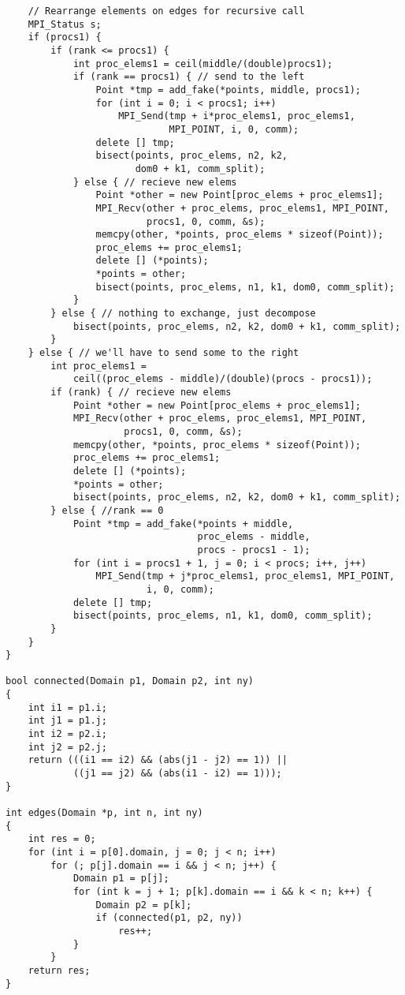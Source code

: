 \documentclass[oneside,final,14pt]{extreport}
\begin{document}
\begin{verbatim}
    // Rearrange elements on edges for recursive call
    MPI_Status s;
    if (procs1) {
        if (rank <= procs1) {
            int proc_elems1 = ceil(middle/(double)procs1);
            if (rank == procs1) { // send to the left
                Point *tmp = add_fake(*points, middle, procs1);
                for (int i = 0; i < procs1; i++)
                    MPI_Send(tmp + i*proc_elems1, proc_elems1,
                             MPI_POINT, i, 0, comm);
                delete [] tmp;
                bisect(points, proc_elems, n2, k2,
                       dom0 + k1, comm_split);
            } else { // recieve new elems
                Point *other = new Point[proc_elems + proc_elems1];
                MPI_Recv(other + proc_elems, proc_elems1, MPI_POINT,
                         procs1, 0, comm, &s);
                memcpy(other, *points, proc_elems * sizeof(Point));
                proc_elems += proc_elems1;
                delete [] (*points);
                *points = other;
                bisect(points, proc_elems, n1, k1, dom0, comm_split);
            }
        } else { // nothing to exchange, just decompose
            bisect(points, proc_elems, n2, k2, dom0 + k1, comm_split);
        }
    } else { // we'll have to send some to the right
        int proc_elems1 =
            ceil((proc_elems - middle)/(double)(procs - procs1));
        if (rank) { // recieve new elems
            Point *other = new Point[proc_elems + proc_elems1];
            MPI_Recv(other + proc_elems, proc_elems1, MPI_POINT,
                     procs1, 0, comm, &s);
            memcpy(other, *points, proc_elems * sizeof(Point));
            proc_elems += proc_elems1;
            delete [] (*points);
            *points = other;
            bisect(points, proc_elems, n2, k2, dom0 + k1, comm_split);
        } else { //rank == 0
            Point *tmp = add_fake(*points + middle,
                                  proc_elems - middle,
                                  procs - procs1 - 1);
            for (int i = procs1 + 1, j = 0; i < procs; i++, j++)
                MPI_Send(tmp + j*proc_elems1, proc_elems1, MPI_POINT,
                         i, 0, comm);
            delete [] tmp;
            bisect(points, proc_elems, n1, k1, dom0, comm_split);
        }
    }
}

bool connected(Domain p1, Domain p2, int ny)
{
    int i1 = p1.i;
    int j1 = p1.j;
    int i2 = p2.i;
    int j2 = p2.j;
    return (((i1 == i2) && (abs(j1 - j2) == 1)) ||
            ((j1 == j2) && (abs(i1 - i2) == 1)));
}

int edges(Domain *p, int n, int ny)
{
    int res = 0;
    for (int i = p[0].domain, j = 0; j < n; i++)
        for (; p[j].domain == i && j < n; j++) {
            Domain p1 = p[j];
            for (int k = j + 1; p[k].domain == i && k < n; k++) {
                Domain p2 = p[k];
                if (connected(p1, p2, ny))
                    res++;
            }
        }
    return res;
}


\end{verbatim}
\end{document}
